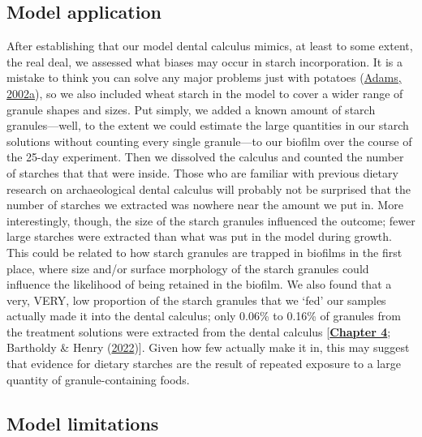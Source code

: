 \documentclass[
  letterpaper,
]{book}
\begin{document}
\hypertarget{model-application}{%
\subsection{Model application}\label{model-application}}

After establishing that our model dental calculus mimics, at least to
some extent, the real deal, we assessed what biases may occur in starch
incorporation. It is a mistake to think you can solve any major problems
just with potatoes (\protect\hyperlink{ref-adamsLifeUniverse2002}{Adams,
2002a}), so we also included wheat starch in the model to cover a wider
range of granule shapes and sizes. Put simply, we added a known amount
of starch granules---well, to the extent we could estimate the large
quantities in our starch solutions without counting every single
granule---to our biofilm over the course of the 25-day experiment. Then
we dissolved the calculus and counted the number of starches that that
were inside. Those who are familiar with previous dietary research on
archaeological dental calculus will probably not be surprised that the
number of starches we extracted was nowhere near the amount we put in.
More interestingly, though, the size of the starch granules influenced
the outcome; fewer large starches were extracted than what was put in
the model during growth. This could be related to how starch granules
are trapped in biofilms in the first place, where size and/or surface
morphology of the starch granules could influence the likelihood of
being retained in the biofilm. We also found that a very, VERY, low
proportion of the starch granules that we `fed' our samples actually
made it into the dental calculus; only 0.06\% to 0.16\% of granules from
the treatment solutions were extracted from the dental calculus
{[}\protect\hyperlink{byoc-starch}{\textbf{Chapter 4}}; Bartholdy \&
Henry
(\protect\hyperlink{ref-bartholdyInvestigatingBiases2022}{2022}){]}.
Given how few actually make it in, this may suggest that evidence for
dietary starches are the result of repeated exposure to a large quantity
of granule-containing foods.

\hypertarget{disc-model-limitations}{%
\subsection{Model limitations}\label{disc-model-limitations}}
\end{document}
